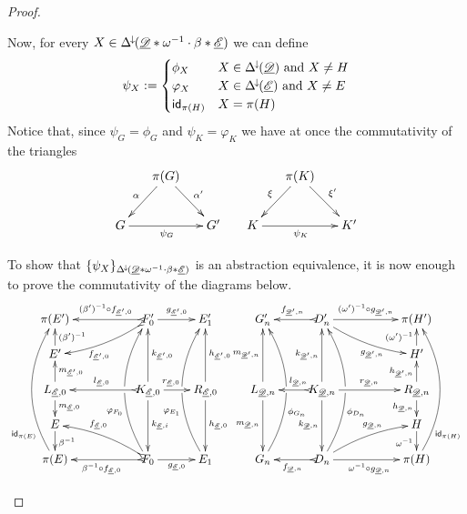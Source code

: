 \begin{proof}
\begin{itemize}
		Now, for every $X\in \Delta^{\hspace{-1pt}\downarrow\hspace{-1pt}}(\underline{\mathscr{D}}*\omega^{-1}\cdot \beta*\underline{\mathscr{E}})$ we can define
		\[\psi_X:=\begin{cases}
			\phi_X & X\in  \Delta^{\hspace{-1pt}\downarrow\hspace{-1pt}}(\underline{\mathscr{D}})\text{ and } X\neq H\\\varphi_X & X\in  \Delta^{\hspace{-1pt}\downarrow\hspace{-1pt}}(\underline{\mathscr{E}}) \text{ and } X\neq E\\\mathsf{id}_{\pi(H)}& X=\pi(H)\end{cases}\]
		Notice that, since $\psi_G=\phi_G$ and $\psi_K=\varphi_K$ we have at once  the commutativity of the triangles
		\[\xymatrix@C=15pt{&\pi(G) \ar[dr]^{\alpha'} \ar[dl]_{\alpha}&&& \pi(K) \ar[dr]^{\xi'} \ar[dl]_{\xi}\\ G\ar[rr]_{\psi_G} && G' &K \ar[rr]_{\psi_K} && K' } \]
		
		
		To show that $\{\psi_X\}_{\Delta^{\hspace{-1pt}\downarrow\hspace{-1pt}}(\underline{\mathscr{D}}*\omega^{-1}\cdot \beta*\underline{\mathscr{E}})}$ is an abstraction equivalence, it is now enough to prove the commutativity of the diagrams below.
		\[\xymatrix@R=15pt@C=22pt{\pi(E')&&F'_0 \ar@{>->}[ll]_-{(\beta')^{-1}\circ f_{\der{E}',0}} \ar@{>->}@/^.2cm/[dll]^(.6){f_{\der{E}',0}} \ar[r]^{g_{\der{E}',0}}&E'_1 &G'_n&D'_n \ar[rr]^-{(\omega')^{-1}\circ g_{\der{D}',n}} \ar@/_.2cm/[drr]_(.6){g_{\der{D}',n}} \ar@{>->}[l]_{f_{\der{D}',n}}&&\pi(H')
			\\E' \ar[u]_{(\beta')^{-1}} &&&&&&&H' \ar[u]^{(\omega')^{-1}}
			\\  L_{\der{E}, 0} \ar[u]_{m_{\der{E}', 0}} \ar[d]^{m_{\der{E}, 0}}&& K_{\der{E}, 0} \ar[uu]_{k_{\der{E}', 0}} \ar[dd]^{k_{\der{E}, i}} \ar[r]^(.4){r_{\der{E},0}} \ar@{>->}[ll]_{l_{\der{E},0}} &R_{\der{E}, 0}\ar[uu]_{h_{\der{E}',0}} \ar[dd]^{h_{\der{E},0}} & L_{\der{D}, n} \ar[uu]^{m_{\der{D}',n}} \ar[dd]_{m_{\der{D},n}}& K_{\der{D}, n} \ar[uu]^{k_{\der{D}',n}} \ar[dd]_{k_{\der{D},n}} \ar[rr]^{r_{\der{D},n}} \ar@{>->}[l]_(.4){l_{\der{D},n}} &&R_{\der{D}, n}\ar[u]^{h_{\der{D}',n}} \ar[d]_{h_{\der{D},n}}
			\\E \ar[d]^{\beta^{-1}}&&&&&&&H \ar[d]_{\omega^{-1}}
			\\\pi(E) \ar@/^.7cm/[uuuu]^(.2){\id{\pi(E)}}&&F_0\ar@{>->}[ll]^{\beta^{-1}\circ f_{\der{E},0}}\ar@/^.7cm/[uuuu]^(.35){\varphi_{F_0}}|\hole \ar@{>->}@/_.2cm/[ull]_(.6){f_{\der{E},0}}\ar[r]_{g_{\der{E},0}}&E_1\ar@/^.7cm/[uuuu]^(.35){\varphi_{E_1}}|\hole&G_n \ar@/_.7cm/[uuuu]_(.35){\phi_{G_n}}|\hole&D_n\ar@{>->}[l]^{f_{\der{D},n}}\ar@/_.7cm/[uuuu]_(.35){\phi_{D_n}}|\hole \ar@/^.2cm/[urr]^(.6){g_{\der{D},n}}\ar[rr]_{\omega^{-1}\circ g_{\der{D},n}}&&\pi(H)\ar@/_.7cm/[uuuu]_(.2){\id{\pi(H)}}} \]
		

\end{itemize}
\end{proof}
